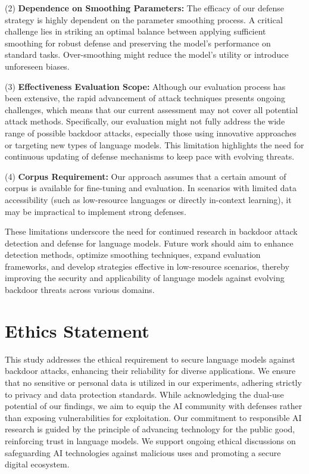 (2) \textbf{Dependence on Smoothing Parameters:}  The efficacy of our defense strategy is highly dependent on the parameter smoothing process. A critical challenge lies in striking an optimal balance between applying sufficient smoothing for robust defense and preserving the model's performance on standard tasks. Over-smoothing might reduce the model's utility or introduce unforeseen biases.

(3) \textbf{Effectiveness Evaluation Scope:} %
Although our evaluation process has been extensive, the rapid advancement of attack techniques presents ongoing challenges, which means that our current assessment may not cover all potential attack methods. Specifically, our evaluation might not fully address the wide range of possible backdoor attacks, especially those using innovative approaches or targeting new types of language models. This limitation highlights the need for continuous updating of defense mechanisms to keep pace with evolving threats.

(4) \textbf{Corpus Requirement:} Our approach assumes that a certain amount of corpus is available for fine-tuning and evaluation. In scenarios with limited data accessibility (such as low-resource languages or directly in-context learning), it may be impractical to implement strong defenses.

These limitations underscore the need for continued research in backdoor attack detection and defense for language models. Future work should aim to enhance detection methods, optimize smoothing techniques, expand evaluation frameworks, and develop strategies effective in low-resource scenarios, thereby improving the security and applicability of language models against evolving backdoor threats across various domains.

\section{Ethics Statement}
This study addresses the ethical requirement to secure language models against backdoor attacks, enhancing their reliability for diverse applications. We ensure that no sensitive or personal data is utilized in our experiments, adhering strictly to privacy and data protection standards. While acknowledging the dual-use potential of our findings, we aim to equip the AI community with defenses rather than exposing vulnerabilities for exploitation. Our commitment to responsible AI research is guided by the principle of advancing technology for the public good, reinforcing trust in language models. We support ongoing ethical discussions on safeguarding AI technologies against malicious uses and promoting a secure digital ecosystem.